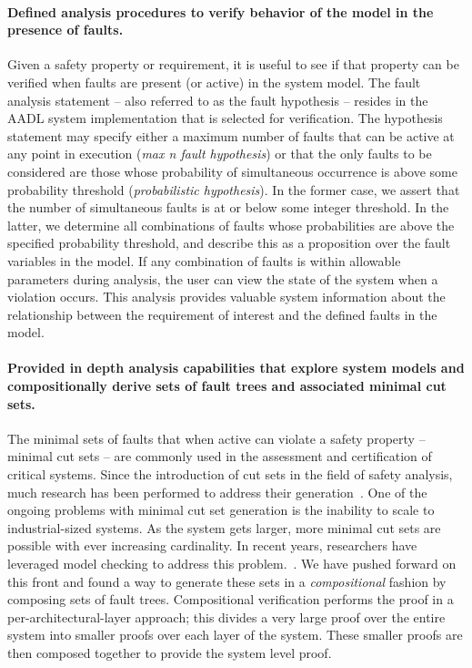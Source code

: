 \paragraph{Defined analysis procedures to verify behavior of the model in the presence of faults.}
Given a safety property or requirement, it is useful to see if that property can be verified when faults are present (or active) in the system model. The fault analysis statement -- also referred to as the fault hypothesis -- resides in the AADL system implementation that is selected for verification. The hypothesis statement may specify either a maximum number of faults that can be active at any point in execution (\emph{max n fault hypothesis}) or that the only faults to be considered are those whose probability of simultaneous occurrence is above some probability threshold (\emph{probabilistic hypothesis}).  In the former case, we assert that the number of simultaneous faults is at or below some integer threshold.  In the latter, we determine all combinations of faults whose probabilities are above the specified probability threshold, and describe this as a proposition over the fault variables in the model. If any combination of faults is within allowable parameters during analysis, the user can view the state of the system when a violation occurs. This analysis provides valuable system information about the relationship between the requirement of interest and the defined faults in the model. 

\paragraph{Provided in depth analysis capabilities that explore system models and compositionally derive sets of fault trees and associated minimal cut sets.}
The minimal sets of faults that when active can violate a safety property -- minimal cut sets -- are commonly used in the assessment and certification of critical systems. Since the introduction of cut sets in the field of safety analysis, much research has been performed to address their generation~\cite{fta:survey,rauzy1993new,historyFTA,Bozzano:2010:DSA:1951720,rausand2003system}. One of the ongoing problems with minimal cut set generation is the inability to scale to industrial-sized systems. As the system gets larger, more minimal cut sets are possible with ever increasing cardinality. In recent years, researchers have leveraged model checking to address this problem.~\cite{bieber2002combination,schafer2003combining,fta:survey,contractBasedDesign,symbFTA,DBLP:conf/cav/BozzanoCPJKPRT15}. We have pushed forward on this front and found a way to generate these sets in a \emph{compositional} fashion by composing sets of fault trees. Compositional verification performs the proof in a per-architectural-layer approach; this divides a very large proof over the entire system into smaller proofs over each layer of the system. These smaller proofs are then composed together to provide the system level proof. 

